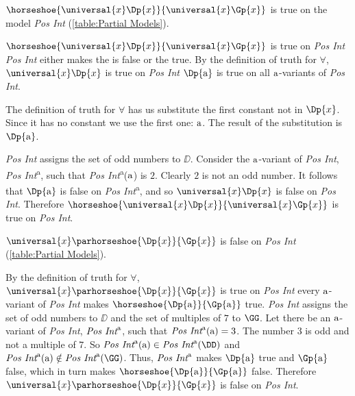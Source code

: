 \begin{majorILnc}{}
$\horseshoe{\universal{\variable{x}}\Dp{\variable{x}}}{\universal{\variable{x}}\Gp{\variable{x}}}$ is true on the model \emph{Pos Int} (\ref{table:Partial Models}).
\end{majorILnc}
\begin{PROOF}
	$\horseshoe{\universal{\variable{x}}\Dp{\variable{x}}}{\universal{\variable{x}}\Gp{\variable{x}}}$ is true on \emph{Pos Int} \Iff \emph{Pos Int} either makes the  is false or the  true.
	By the definition of truth for $\forall$, $\universal{\variable{x}}\Dp{\variable{x}}$ is true on \emph{Pos Int} \Iff $\Dp{\constant{a}}$ is true on all $\mathrm{a}$-variants of \emph{Pos Int}.
	\begin{commentary}
		The definition of truth for $\forall$ has us substitute the first constant not in $\Dp{\variable{x}}$.
		Since it has no constant we use the first one: $\mathrm{a}$.
		The result of the substitution is $\Dp{\constant{a}}$.
	\end{commentary}
	\noindent{}\emph{Pos Int} assigns the set of odd numbers to $\DD$.
	Consider the $\mathrm{a}$-variant of \emph{Pos Int}, \emph{Pos Int}\textsuperscript{a}, such that \emph{Pos Int}\textsuperscript{a}($\mathrm{a}$) is $2$.
	Clearly $2$ is not an odd number.
	It follows that $\Dp{\constant{a}}$ is false on \emph{Pos Int}\textsuperscript{a}, and so $\universal{\variable{x}}\Dp{\variable{x}}$ is false on \emph{Pos Int}.
	Therefore $\horseshoe{\universal{\variable{x}}\Dp{\variable{x}}}{\universal{\variable{x}}\Gp{\variable{x}}}$ is true on \emph{Pos Int}.
\end{PROOF}

\begin{majorILnc}{}
	$\universal{\variable{x}}\parhorseshoe{\Dp{\variable{x}}}{\Gp{\variable{x}}}$ is false on \emph{Pos Int} (\ref{table:Partial Models}).
\end{majorILnc}
\begin{PROOF}
	By the definition of truth for $\forall$, $\universal{\variable{x}}\parhorseshoe{\Dp{\variable{x}}}{\Gp{\variable{x}}}$ is true on \emph{Pos Int} \Iff every $\mathrm{a}$-variant of \emph{Pos Int} makes $\horseshoe{\Dp{\constant{a}}}{\Gp{\constant{a}}}$ true.
	\emph{Pos Int} assigns the set of odd numbers to $\DD$ and the set of multiples of $7$ to $\GG$.
	Let there be an $\mathrm{a}$-variant of \emph{Pos Int}, $\emph{Pos Int}^{\mathrm{a}}$, such that $\emph{Pos Int}^{\mathrm{a}}(\mathrm{a})=3$.
	The number $3$ is odd and not a multiple of $7$.
	So $\emph{Pos Int}^{\constant{a}}(\constant{a})\in\emph{Pos Int}^{\constant{a}}(\DD)$ and $\emph{Pos Int}^{\constant{a}}(\constant{a})\notin\emph{Pos Int}^{\constant{a}}(\GG)$.
	Thus, $\emph{Pos Int}^{\mathrm{a}}$ makes $\Dp{\constant{a}}$ true and $\Gp{\constant{a}}$ false, which in turn makes $\horseshoe{\Dp{\constant{a}}}{\Gp{\constant{a}}}$ false.
	Therefore $\universal{\variable{x}}\parhorseshoe{\Dp{\variable{x}}}{\Gp{\variable{x}}}$ is false on \emph{Pos Int}.
\end{PROOF}

